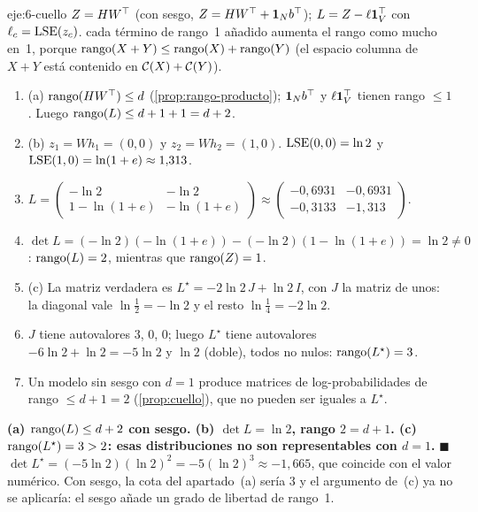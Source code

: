 \begin{solucion}{eje:6-cuello}
\datos $Z=HW^{\top}$ (con sesgo, $Z=HW^{\top}+\mathbf{1}_Nb^{\top}$); $L=Z-\ell\mathbf{1}_V^{\top}$ con $\ell_c=\operatorname{LSE}(z_c)$.
\planteamiento cada término de rango~1 añadido aumenta el rango como mucho en~1, porque $\operatorname{rango}(X+Y)\le\operatorname{rango}(X)+\operatorname{rango}(Y)$ (el espacio columna de $X+Y$ está contenido en $\mathcal{C}(X)+\mathcal{C}(Y)$).
\pasos
\begin{enumerate}[label=\arabic*.]
  \item (a) $\operatorname{rango}(HW^{\top})\le d$ (\cref{prop:rango-producto}); $\mathbf{1}_Nb^{\top}$ y $\ell\mathbf{1}_V^{\top}$ tienen rango $\le 1$. Luego $\operatorname{rango}(L)\le d+1+1=d+2$.
  \item (b) $z_1=W h_1=(0,0)$ y $z_2=Wh_2=(1,0)$. $\operatorname{LSE}(0,0)=\ln 2$ y $\operatorname{LSE}(1,0)=\ln(1+e)\approx 1{,}313$.
  \item $L=\begin{pmatrix}-\ln 2&-\ln 2\\1-\ln(1+e)&-\ln(1+e)\end{pmatrix}\approx\begin{pmatrix}-0{,}6931&-0{,}6931\\-0{,}3133&-1{,}313\end{pmatrix}$.
  \item $\det L=(-\ln 2)(-\ln(1+e))-(-\ln 2)(1-\ln(1+e))=\ln 2\ne 0$: $\operatorname{rango}(L)=2$, mientras que $\operatorname{rango}(Z)=1$.
  \item (c) La matriz verdadera es $L^{\star}=-2\ln 2\,J+\ln 2\,I$, con $J$ la matriz de unos: la diagonal vale $\ln\tfrac12=-\ln 2$ y el resto $\ln\tfrac14=-2\ln 2$.
  \item $J$ tiene autovalores $3$, $0$, $0$; luego $L^{\star}$ tiene autovalores $-6\ln 2+\ln 2=-5\ln 2$ y $\ln 2$ (doble), todos no nulos: $\operatorname{rango}(L^{\star})=3$.
  \item Un modelo sin sesgo con $d=1$ produce matrices de log-probabilidades de rango $\le d+1=2$ (\cref{prop:cuello}), que no pueden ser iguales a $L^{\star}$.
\end{enumerate}
\resultado \textbf{(a) $\operatorname{rango}(L)\le d+2$ con sesgo. (b) $\det L=\ln 2$, rango $2=d+1$. (c) $\operatorname{rango}(L^{\star})=3>2$: esas distribuciones no son representables con $d=1$.} \hfill$\blacksquare$
\comprobacion $\det L^{\star}=(-5\ln 2)(\ln 2)^{2}=-5(\ln 2)^{3}\approx -1{,}665$, que coincide con el valor numérico. Con sesgo, la cota del apartado~(a) sería $3$ y el argumento de~(c) ya no se aplicaría: el sesgo añade un grado de libertad de rango~1.
\end{solucion}
